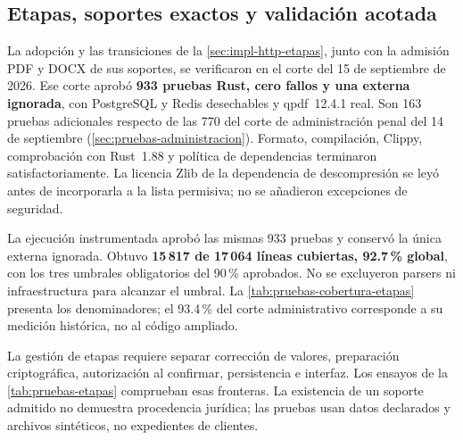 \subsection{Etapas, soportes exactos y validación acotada}\label{sec:pruebas-etapas}

La adopción y las transiciones de la \cref{sec:impl-http-etapas}, junto con la admisión PDF y DOCX de sus soportes, se verificaron en el corte del 15 de septiembre de 2026. Ese corte aprobó \textbf{933 pruebas Rust, cero fallos y una externa ignorada}, con PostgreSQL y Redis desechables y qpdf~12.4.1 real. Son 163 pruebas adicionales respecto de las 770 del corte de administración penal del 14 de septiembre (\cref{sec:pruebas-administracion}). Formato, compilación, Clippy, comprobación con Rust~1.88 y política de dependencias terminaron satisfactoriamente. La licencia Zlib de la dependencia de descompresión se leyó antes de incorporarla a la lista permisiva; no se añadieron excepciones de seguridad.


La ejecución instrumentada aprobó las mismas 933 pruebas y conservó la única externa ignorada. Obtuvo \textbf{15\,817 de 17\,064 líneas cubiertas, 92.7\,\% global}, con los tres umbrales obligatorios del 90\,\% aprobados. No se excluyeron parsers ni infraestructura para alcanzar el umbral. La \cref{tab:pruebas-cobertura-etapas} presenta los denominadores; el 93.4\,\% del corte administrativo corresponde a su medición histórica, no al código ampliado.

La gestión de etapas requiere separar corrección de valores, preparación criptográfica, autorización al confirmar, persistencia e interfaz. Los ensayos de la \cref{tab:pruebas-etapas} comprueban esas fronteras. La existencia de un soporte admitido no demuestra procedencia jurídica; las pruebas usan datos declarados y archivos sintéticos, no expedientes de clientes.

